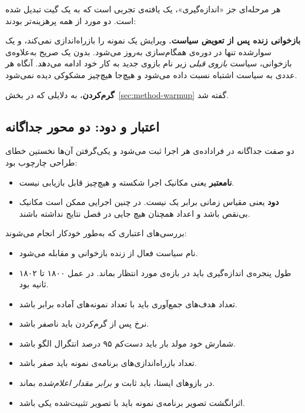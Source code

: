 هر مرحله‌ای جز «اندازه‌گیری»، یک یافته‌ی تجربی است که به یک گیت تبدیل شده است. دو مورد از
همه پرهزینه‌تر بودند:

\textbf{بازخوانی  زنده پس از تعویض سیاست.} ویرایش یک  نمونه را
بازراه‌اندازی نمی‌کند، و یک  سوارشده تنها در دوره‌ی همگام‌سازی 
به‌روز می‌شود. بدون یک  صریح به‌علاوه‌ی بازخوانی، سیاست \emph{بازوی قبلی}
زیر نام بازوی جدید به کار خود ادامه می‌دهد. آنگاه هر عددی به سیاست اشتباه نسبت داده می‌شود و
هیچ‌جا هیچ‌چیز مشکوکی دیده نمی‌شود.

\textbf{گرم‌کردن}، به دلایلی که در بخش~\ref{sec:method-warmup} گفته شد.

\subsection{اعتبار و دود: دو محور جداگانه}
\label{sec:method-validity}

دو صفت جداگانه در فراداده‌ی هر اجرا ثبت می‌شود و یکی‌گرفتن آن‌ها نخستین خطای طراحی چارچوب
بود:

\begin{itemize}
  \item \textbf{نامعتبر} یعنی مکانیک اجرا شکسته و هیچ‌چیز قابل بازیابی نیست.
  \item \textbf{دود} یعنی مقیاس زمانی برابر یک نیست. در چنین اجرایی
  ممکن است مکانیک بی‌نقص باشد و اعداد همچنان هیچ جایی در فصل نتایج نداشته باشند.
\end{itemize}

بررسی‌های اعتباری که به‌طور خودکار انجام می‌شوند:

\begin{itemize}
  \item نام سیاست فعال از  زنده بازخوانی و مقابله می‌شود.
  \item طول پنجره‌ی اندازه‌گیری باید در بازه‌ی مورد انتظار بماند. در عمل ۱۸۰۰ تا ۱۸۰۲ ثانیه بود.
  \item تعداد هدف‌های جمع‌آوری باید با تعداد نمونه‌های آماده برابر باشد.
  \item نرخ  پس از گرم‌کردن باید ناصفر باشد.
  \item شمارش  خود مولد بار باید دست‌کم ۹۵ درصد انتگرال الگو باشد.
  \item تعداد بازراه‌اندازی‌های برنامه‌ی نمونه باید صفر باشد.
  \item در بازوهای ایستا،  باید ثابت \emph{و برابر مقدار اعلام‌شده} بماند.
  \item اثرانگشت تصویر برنامه‌ی نمونه باید با تصویر تثبیت‌شده یکی باشد.
\end{itemize}

